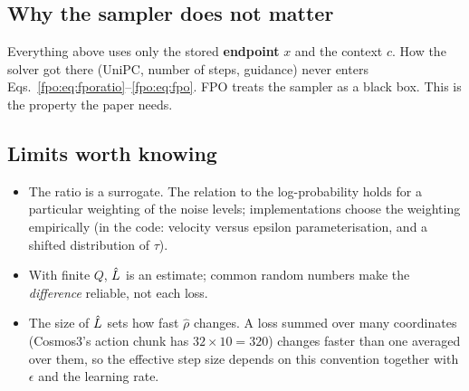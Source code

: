 \subsection{Why the sampler does not matter}
Everything above uses only the stored \textbf{endpoint} $x$ and the context $c$. How the solver got there (UniPC, number of steps, guidance) never enters Eqs.~\eqref{fpo:eq:fporatio}--\eqref{fpo:eq:fpo}. FPO treats the sampler as a black box. This is the property the paper needs.

\subsection{Limits worth knowing}
\begin{itemize}
\item The ratio is a surrogate. The relation to the log-probability holds for a particular weighting of the noise levels; implementations choose the weighting empirically (in the code: velocity versus epsilon parameterisation, and a shifted distribution of $\tau$).
\item With finite $Q$, $\hat L$ is an estimate; common random numbers make the \emph{difference} reliable, not each loss.
\item The size of $\hat L$ sets how fast $\hat\rho$ changes. A loss summed over many coordinates (Cosmos3's action chunk has $32\times10=320$) changes faster than one averaged over them, so the effective step size depends on this convention together with $\epsilon$ and the learning rate.
\end{itemize}


